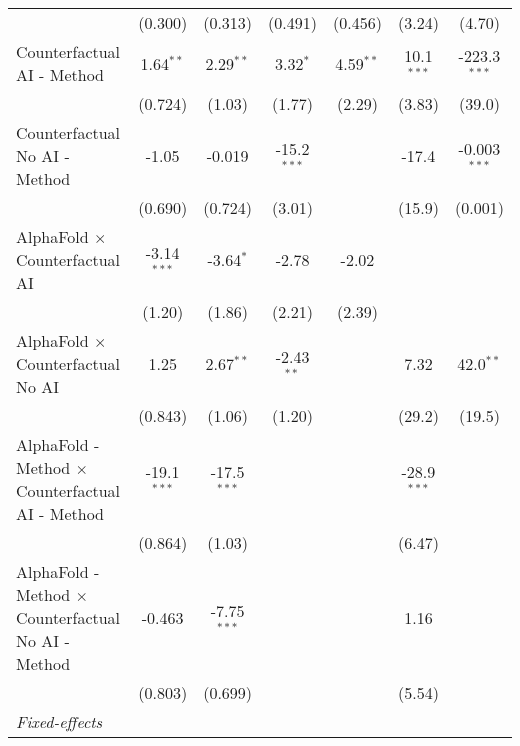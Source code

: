 \begin{tabular}{lcccccc}
                                                              & (0.300)       & (0.313)       & (0.491)       & (0.456)      & (3.24)        & (4.70)\\   
   Counterfactual AI - Method                                 & 1.64$^{**}$   & 2.29$^{**}$   & 3.32$^{*}$    & 4.59$^{**}$  & 10.1$^{***}$  & -223.3$^{***}$\\   
                                                              & (0.724)       & (1.03)        & (1.77)        & (2.29)       & (3.83)        & (39.0)\\   
   Counterfactual No AI - Method                              & -1.05         & -0.019        & -15.2$^{***}$ &              & -17.4         & -0.003$^{***}$\\   
                                                              & (0.690)       & (0.724)       & (3.01)        &              & (15.9)        & (0.001)\\   
   AlphaFold $\times$ Counterfactual AI                       & -3.14$^{***}$ & -3.64$^{*}$   & -2.78         & -2.02        &               &   \\   
                                                              & (1.20)        & (1.86)        & (2.21)        & (2.39)       &               &   \\   
   AlphaFold $\times$ Counterfactual No AI                    & 1.25          & 2.67$^{**}$   & -2.43$^{**}$  &              & 7.32          & 42.0$^{**}$\\   
                                                              & (0.843)       & (1.06)        & (1.20)        &              & (29.2)        & (19.5)\\   
   AlphaFold - Method $\times$ Counterfactual AI - Method     & -19.1$^{***}$ & -17.5$^{***}$ &               &              & -28.9$^{***}$ &   \\   
                                                              & (0.864)       & (1.03)        &               &              & (6.47)        &   \\   
   AlphaFold - Method $\times$ Counterfactual No AI - Method  & -0.463        & -7.75$^{***}$ &               &              & 1.16          &   \\   
                                                              & (0.803)       & (0.699)       &               &              & (5.54)        &   \\   
   \midrule
   \emph{Fixed-effects}\\

\end{tabular}
